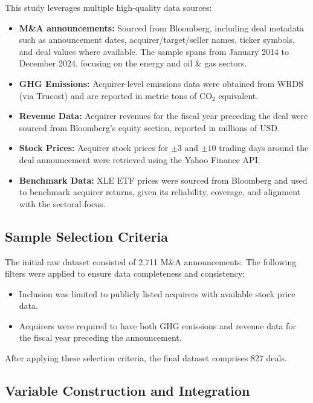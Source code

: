 \documentclass[a4paper]{article}
\begin{document}
This study leverages multiple high-quality data sources:

\begin{itemize}
    \setlength{\itemsep}{0pt} 
    \item \textbf{M\&A announcements:} Sourced from Bloomberg, including deal metadata such as announcement dates, acquirer/target/seller names, ticker symbols, and deal values where available. The sample spans from January 2014 to December 2024, focusing on the energy and oil \& gas sectors.
    \item \textbf{GHG Emissions:} Acquirer-level emissions data were obtained from WRDS (via Trucost) and are reported in metric tons of CO$_2$ equivalent.
    \item \textbf{Revenue Data:} Acquirer revenues for the fiscal year preceding the deal were sourced from Bloomberg's equity section, reported in millions of USD.
    \item \textbf{Stock Prices:} Acquirer stock prices for \(\pm3\) and \(\pm10\) trading days around the deal announcement were retrieved using the Yahoo Finance API.
    \item \textbf{Benchmark Data:} XLE ETF prices were sourced from Bloomberg and used to benchmark acquirer returns, given its reliability, coverage, and alignment with the sectoral focus.
\end{itemize}

\subsection{Sample Selection Criteria}

The initial raw dataset consisted of 2,711 M\&A announcements. The following filters were applied to ensure data completeness and consistency:

\begin{itemize}
    \setlength{\itemsep}{0pt} 
    \item Inclusion was limited to publicly listed acquirers with available stock price data. 
    \item Acquirers were required to have both GHG emissions and revenue data for the fiscal year preceding the announcement.
\end{itemize}

After applying these selection criteria, the final dataset comprises 827 deals.

\subsection{Variable Construction and Integration}
\end{document}

